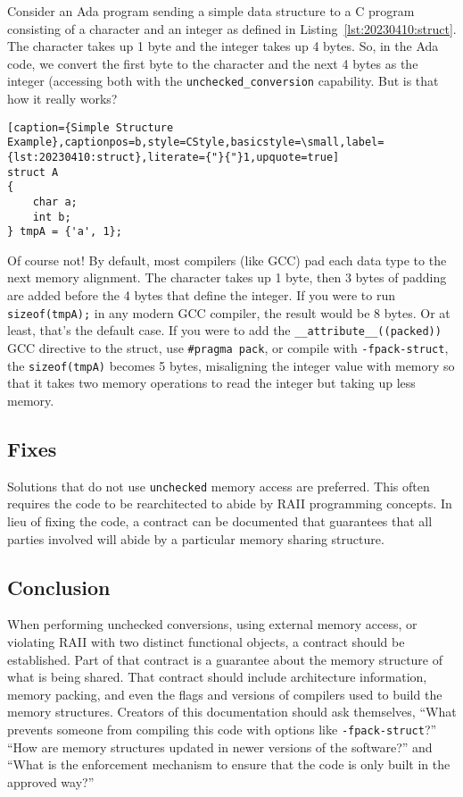Consider an Ada program sending a simple data structure to a C program consisting of a character and an integer as defined in Listing~\ref{lst:20230410:struct}. The character takes up 1 byte and the integer takes up 4 bytes. So, in the Ada code, we convert the first byte to the character and the next 4 bytes as the integer (accessing both with the \texttt{unchecked\_conversion} capability. But is that how it really works?
\begin{lstlisting}[caption={Simple Structure Example},captionpos=b,style=CStyle,basicstyle=\small,label={lst:20230410:struct},literate={"}{"}1,upquote=true]
struct A
{
	char a;
	int b;
} tmpA = {'a', 1};
\end{lstlisting}

Of course not! By default, most compilers (like GCC) pad each data type to the next memory alignment. The character takes up 1 byte, then 3 bytes of padding are added before the 4 bytes that define the integer. If you were to run \texttt{sizeof(tmpA);} in any modern GCC compiler, the result would be 8 bytes. Or at least, that's the default case. If you were to add the \texttt{\_\_attribute\_\_((packed))} GCC directive to the struct, use \texttt{\#pragma pack}, or compile with \texttt{-fpack-struct}, the \texttt{sizeof(tmpA)} becomes 5 bytes, misaligning the integer value with memory so that it takes two memory operations to read the integer but taking up less memory.

\subsection{Fixes}
Solutions that do not use \texttt{unchecked} memory access are preferred. This often requires the code to be rearchitected to abide by RAII programming concepts. In lieu of fixing the code, a contract can be documented that guarantees that all parties involved will abide by a particular memory sharing structure.

\subsection{Conclusion}
When performing unchecked conversions, using external memory access, or violating RAII with two distinct functional objects, a contract should be established. Part of that contract is a guarantee about the memory structure of what is being shared. That contract should include architecture information, memory packing, and even the flags and versions of compilers used to build the memory structures. Creators of this documentation should ask themselves, ``What prevents someone from compiling this code with options like \texttt{-fpack-struct}?'' ``How are memory structures updated in newer versions of the software?'' and ``What is the enforcement mechanism to ensure that the code is only built in the approved way?''

